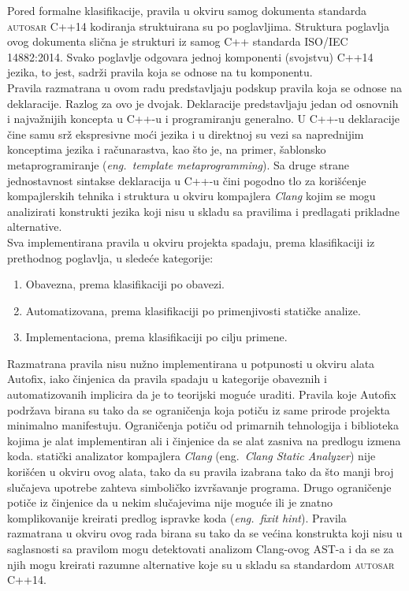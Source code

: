 \documentclass[12pt,oneside]{memoir}
\begin{document}
Pored formalne klasifikacije, pravila u okviru samog dokumenta standarda \textsc{autosar} C++14  kodiranja struktuirana su po poglavljima.
Struktura poglavlja ovog dokumenta slična je strukturi iz samog C++ standarda ISO/IEC 14882:2014. Svako poglavlje odgovara jednoj komponenti (svojstvu) C++14 jezika, to jest, sadrži pravila koja se odnose na tu komponentu.
\\
\indent
Pravila razmatrana u ovom radu predstavljaju podskup pravila koja se odnose na deklaracije. Razlog za ovo je dvojak. Deklaracije predstavljaju jedan
od osnovnih i najvažnijih koncepta u C++-u i programiranju generalno. U C++-u deklaracije čine samu srž ekspresivne moći jezika i u direktnoj su vezi
sa naprednijim konceptima jezika i računarastva, kao što je, na primer, šablonsko metaprogramiranje (\textit{eng.~template metaprogramming}).
Sa druge strane jednostavnost sintakse deklaracija u C++-u čini pogodno tlo za korišćenje kompajlerskih tehnika i struktura u okviru kompajlera \textit{Clang} kojim se mogu analizirati konstrukti jezika koji nisu u skladu sa pravilima i predlagati prikladne alternative.
\\
\indent
Sva implementirana pravila u okviru projekta spadaju, prema klasifikaciji iz prethodnog poglavlja, u sledeće kategorije:
\begin{enumerate}
  \item{Obavezna, prema klasifikaciji po obavezi.}
  \item{Automatizovana, prema klasifikaciji po primenjivosti statičke analize.}
  \item{Implementaciona, prema klasifikaciji po cilju primene.}
\end{enumerate}

Razmatrana pravila nisu nužno implementirana u potpunosti u okviru alata Autofix, iako činjenica da pravila spadaju u kategorije obaveznih i automatizovanih
implicira da je to teorijski moguće uraditi. Pravila koje Autofix podržava birana su tako da se ograničenja koja potiču iz same prirode projekta minimalno manifestuju. Ograničenja potiču od primarnih tehnologija i biblioteka kojima je alat implementiran ali i činjenice da se alat zasniva na predlogu izmena koda. 
stati\v{c}ki analizator kompajlera \textit{Clang} \cite{CSAWebsite} (eng.~\textit{Clang Static Analyzer}) nije korišćen u okviru ovog alata, tako da su pravila izabrana tako da što manji broj slučajeva upotrebe zahteva simboličko izvršavanje programa. Drugo ograničenje potiče iz činjenice da u nekim slučajevima nije moguće ili je znatno komplikovanije kreirati predlog ispravke koda (\textit{eng.~fixit hint}). Pravila razmatrana u okviru ovog rada birana su tako da se većina konstrukta koji nisu u saglasnosti sa pravilom mogu detektovati analizom Clang-ovog AST-a i da se za njih mogu kreirati razumne alternative koje su u skladu sa standardom \textsc{autosar} C++14.
\end{document}
